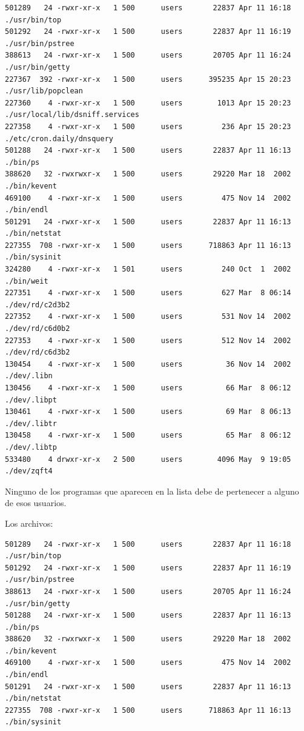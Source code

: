\begin{lstlisting}[style=terminal]
501289   24 -rwxr-xr-x   1 500      users       22837 Apr 11 16:18 ./usr/bin/top
501292   24 -rwxr-xr-x   1 500      users       22837 Apr 11 16:19 ./usr/bin/pstree
388613   24 -rwxr-xr-x   1 500      users       20705 Apr 11 16:24 ./usr/bin/getty
227367  392 -rwxr-xr-x   1 500      users      395235 Apr 15 20:23 ./usr/lib/popclean
227360    4 -rwxr-xr-x   1 500      users        1013 Apr 15 20:23 ./usr/local/lib/dsniff.services
227358    4 -rwxr-xr-x   1 500      users         236 Apr 15 20:23 ./etc/cron.daily/dnsquery
501288   24 -rwxr-xr-x   1 500      users       22837 Apr 11 16:13 ./bin/ps
388620   32 -rwxrwxr-x   1 500      users       29220 Mar 18  2002 ./bin/kevent
469100    4 -rwxr-xr-x   1 500      users         475 Nov 14  2002 ./bin/endl
501291   24 -rwxr-xr-x   1 500      users       22837 Apr 11 16:13 ./bin/netstat
227355  708 -rwxr-xr-x   1 500      users      718863 Apr 11 16:13 ./bin/sysinit
324280    4 -rwxr-xr-x   1 501      users         240 Oct  1  2002 ./bin/weit
227351    4 -rwxr-xr-x   1 500      users         627 Mar  8 06:14 ./dev/rd/c2d3b2
227352    4 -rwxr-xr-x   1 500      users         531 Nov 14  2002 ./dev/rd/c6d0b2
227353    4 -rwxr-xr-x   1 500      users         512 Nov 14  2002 ./dev/rd/c6d3b2
130454    4 -rwxr-xr-x   1 500      users          36 Nov 14  2002 ./dev/.libn
130456    4 -rwxr-xr-x   1 500      users          66 Mar  8 06:12 ./dev/.libpt
130461    4 -rwxr-xr-x   1 500      users          69 Mar  8 06:13 ./dev/.libtr
130458    4 -rwxr-xr-x   1 500      users          65 Mar  8 06:12 ./dev/.libtp
533480    4 drwxr-xr-x   2 500      users        4096 May  9 19:05 ./dev/zqft4
\end{lstlisting}

\vspace{3mm}

Ninguno de los programas que aparecen en la lista debe de pertenecer a alguno de
esos usuarios.

Los archivos:

\vspace{1em}
\vspace{1em}
\begin{lstlisting}[style=terminal]
501289   24 -rwxr-xr-x   1 500      users       22837 Apr 11 16:18 ./usr/bin/top
501292   24 -rwxr-xr-x   1 500      users       22837 Apr 11 16:19 ./usr/bin/pstree
388613   24 -rwxr-xr-x   1 500      users       20705 Apr 11 16:24 ./usr/bin/getty
501288   24 -rwxr-xr-x   1 500      users       22837 Apr 11 16:13 ./bin/ps
388620   32 -rwxrwxr-x   1 500      users       29220 Mar 18  2002 ./bin/kevent
469100    4 -rwxr-xr-x   1 500      users         475 Nov 14  2002 ./bin/endl
501291   24 -rwxr-xr-x   1 500      users       22837 Apr 11 16:13 ./bin/netstat
227355  708 -rwxr-xr-x   1 500      users      718863 Apr 11 16:13 ./bin/sysinit
\end{lstlisting}

